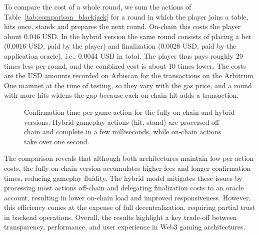 \documentclass[10pt,conference]{IEEEtran}
\begin{document}
To compare the cost of a whole round, we sum the actions of Table~\ref{tab:comparison_blackjack} for a round in which the player joins a table, hits once, stands and prepares the next round. On-chain this costs the player about 0.046 USD. In the hybrid version the same round consists of placing a bet (0.0016 USD, paid by the player) and finalization (0.0028 USD, paid by the application oracle), i.e., 0.0044 USD in total. The player thus pays roughly 29 times less per round, and the combined cost is about 10 times lower. The costs are the USD amounts recorded on Arbiscan for the transactions on the Arbitrum One mainnet at the time of testing, so they vary with the gas price, and a round with more hits widens the gap because each on-chain hit adds a transaction.

\begin{figure}[t]
\centering
{}
\caption{Confirmation time per game action for the fully on-chain and hybrid versions. Hybrid gameplay actions (hit, stand) are processed off-chain and complete in a few milliseconds, while on-chain actions take over one second.}
\label{fig:conf_time}
\end{figure}

The comparison reveals that although both architectures maintain low per-action costs, the fully on-chain version accumulates higher fees and longer confirmation times, reducing gameplay fluidity. The hybrid model mitigates these issues by processing most actions off-chain and delegating finalization costs to an oracle account, resulting in lower on-chain load and improved responsiveness. However, this efficiency comes at the expense of full decentralization, requiring partial trust in backend operations. Overall, the results highlight a key trade-off between transparency, performance, and user experience in Web3 gaming architectures.
\end{document}
